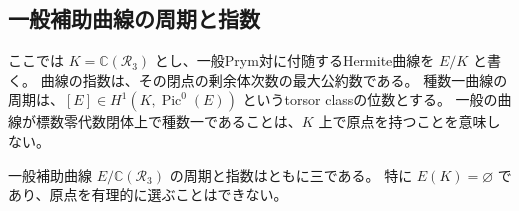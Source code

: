 \subsection{一般補助曲線の周期と指数}
\label{subsec:hermite-index-three-v27}

ここでは $K=\mathbb C(\mathcal R_3)$ とし、一般Prym対に付随するHermite曲線を $E/K$ と書く。
曲線の指数は、その閉点の剰余体次数の最大公約数である。
種数一曲線の周期は、$[E]\in H^1(K,\operatorname{Pic}^0(E))$ というtorsor classの位数とする。
一般の曲線が標数零代数閉体上で種数一であることは、$K$ 上で原点を持つことを意味しない。

\begin{theorem}[補助曲線の指数三]
\label{thm:hermite-index-three-v27}
一般補助曲線 $E/\mathbb C(\mathcal R_3)$ の周期と指数はともに三である。
特に $E(K)=\varnothing$ であり、原点を有理的に選ぶことはできない。
\end{theorem}


